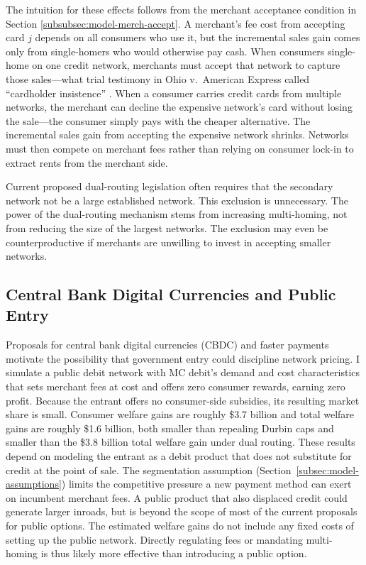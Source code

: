 \documentclass[main.tex]{subfiles}
\begin{document}
The intuition for these effects follows from the merchant acceptance condition in Section \ref{subsubsec:model-merch-accept}.
A merchant's fee cost from accepting card $j$ depends on all consumers who use it, but the incremental sales gain comes only from single-homers who would otherwise pay cash.
When consumers single-home on one credit network, merchants must accept that network to capture those sales---what trial testimony in Ohio v.\ American Express called ``cardholder insistence'' \parencite{Conrath2014}.
When a consumer carries credit cards from multiple networks, the merchant can decline the expensive network's card without losing the sale---the consumer simply pays with the cheaper alternative.
The incremental sales gain from accepting the expensive network shrinks.
Networks must then compete on merchant fees rather than relying on consumer lock-in to extract rents from the merchant side.

Current proposed dual-routing legislation often requires that the secondary network not be a large established network.
This exclusion is unnecessary. 
The power of the dual-routing mechanism stems from increasing multi-homing, not from reducing the size of the largest networks.
The exclusion may even be counterproductive if merchants are unwilling to invest in accepting smaller networks.

\subsection{Central Bank Digital Currencies and Public Entry}
\label{subsec:cf-cbdc}
Proposals for central bank digital currencies (CBDC) and faster payments \parencite{Shin2021,FederalReserve2022,Berg.etal2024a} motivate the possibility that government entry could discipline network pricing.
I simulate a public debit network with MC debit's demand and cost characteristics that sets merchant fees at cost and offers zero consumer rewards, earning zero profit.
Because the entrant offers no consumer-side subsidies, its resulting market share is small.
Consumer welfare gains are roughly \$3.7 billion and total welfare gains are roughly \$1.6 billion, both smaller than repealing Durbin caps and smaller than the \$3.8 billion total welfare gain under dual routing.
These results depend on modeling the entrant as a debit product that does not substitute for credit at the point of sale.
The segmentation assumption (Section~\ref{subsec:model-assumptions}) limits the competitive pressure a new payment method can exert on incumbent merchant fees.
A public product that also displaced credit could generate larger inroads, but is beyond the scope of most of the current proposals for public options.
The estimated welfare gains do not include any fixed costs of setting up the public network.
Directly regulating fees or mandating multi-homing is thus likely more effective than introducing a public option.
\end{document}
